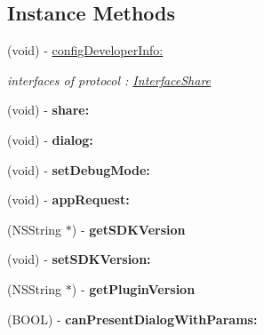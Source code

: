\subsection*{Instance Methods}
\begin{DoxyCompactItemize}
\item 
\mbox{\label{interfaceShareFacebook_a8f5f0826ae2059dcc9b82bbdb371272a}} 
(void) -\/ \hyperlink{interfaceShareFacebook_a8f5f0826ae2059dcc9b82bbdb371272a}{config\+Developer\+Info\+:}
\begin{DoxyCompactList}\small\item\em interfaces of protocol \+: \hyperlink{classInterfaceShare-p}{Interface\+Share} \end{DoxyCompactList}\item 
\mbox{\label{interfaceShareFacebook_ac567540bec437bfb007a2ce4a557800d}} 
(void) -\/ {\bfseries share\+:}
\item 
\mbox{\label{interfaceShareFacebook_a79b56e47e23e8881aa18053bfdfbae62}} 
(void) -\/ {\bfseries dialog\+:}
\item 
\mbox{\label{interfaceShareFacebook_a7807f1b3f719eb25151f701c29fbba2c}} 
(void) -\/ {\bfseries set\+Debug\+Mode\+:}
\item 
\mbox{\label{interfaceShareFacebook_aa415bd4725df6b88419a8cf037d1d308}} 
(void) -\/ {\bfseries app\+Request\+:}
\item 
\mbox{\label{interfaceShareFacebook_a08b63345abc6c03372905da4e4649615}} 
(N\+S\+String $\ast$) -\/ {\bfseries get\+S\+D\+K\+Version}
\item 
\mbox{\label{interfaceShareFacebook_ab96718a4d736ebdd7414a74656d9bd96}} 
(void) -\/ {\bfseries set\+S\+D\+K\+Version\+:}
\item 
\mbox{\label{interfaceShareFacebook_a8eae4fc82b19cdb9a8fee38cd0265ae2}} 
(N\+S\+String $\ast$) -\/ {\bfseries get\+Plugin\+Version}
\item 
\mbox{\label{interfaceShareFacebook_a184a158fc8273fc820684c54bf030e7a}} 
(B\+O\+OL) -\/ {\bfseries can\+Present\+Dialog\+With\+Params\+:}
\end{DoxyCompactItemize}
